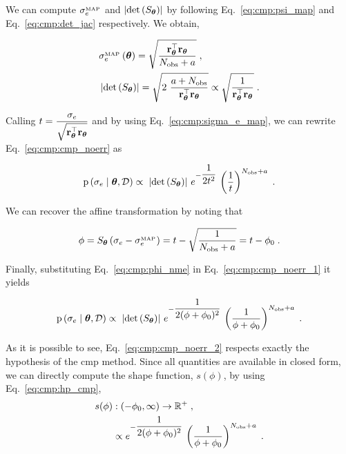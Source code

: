 We can compute $\sigma_e^{_{\text{MAP}}}$ and $\left| \mathrm{det}\left(S_{\boldsymbol{\theta}}\right) \right|$ by following Eq.~\eqref{eq:cmp:psi_map} and Eq.~\eqref{eq:cmp:det_jac} respectively. We obtain,

\begin{equation}
    \left.
    \begin{aligned}
        &\sigma_e^{_\map} \left( \btheta \right) = \sqrt{\dfrac{\rr}{\nobs+a}} \;,\\
        &\abs{\detf{S_{\btheta}}} = \sqrt{2 \ \dfrac{a+\nobs}{\rr}}  \propto \sqrt{\dfrac{1}{\rr}}\;.\\
    \end{aligned}
    \right.
    \label{eq:cmp:sigma_e_map}
\end{equation}

Calling $t = \dfrac{\sigma_e}{\sqrt{\mathbf{r}_{\boldsymbol{\theta}}^{\top} \mathbf{r}_{\boldsymbol{\theta}}}}$ and by using Eq.~\eqref{eq:cmp:sigma_e_map}, we can rewrite Eq.~\eqref{eq:cmp:cmp_noerr} as

\begin{equation}
    \mathrm{p} \left( \sigma_e \mid \boldsymbol{\theta}, \mathcal{D} \right) \propto \; \left| \mathrm{det}\left(S_{\boldsymbol{\theta}}\right) \right| \, e^{-\dfrac{1}{2 t^2}} \,
    \left(\dfrac{1}{t}\right)^{N_{\mathrm{obs}}+a}\; .
    \label{eq:cmp:cmp_noerr_1}
\end{equation}

We can recover the affine transformation by noting that

\begin{equation}
    \phi = S_{\boldsymbol{\theta}} \left( \sigma_e - \sigma_e^{_{\text{MAP}}} \right) = t - \sqrt{\frac{1}{N_{\mathrm{obs}}+a}} = t - \phi_0\;.
    \label{eq:cmp:phi_nme}
\end{equation}

Finally, substituting Eq.~\eqref{eq:cmp:phi_nme} in Eq.~\eqref{eq:cmp:cmp_noerr_1} it yields

\begin{equation}
    \mathrm{p} \left( \sigma_e \mid \boldsymbol{\theta}, \mathcal{D} \right) \propto \; \left| \mathrm{det}\left(S_{\boldsymbol{\theta}}\right) \right| \, e^{-\dfrac{1}{2 (\phi+\phi_0)^2}} \,
    \left(\dfrac{1}{\phi+\phi_0}\right)^{N_{\mathrm{obs}}+a}\; .
    \label{eq:cmp:cmp_noerr_2}
\end{equation}

As it is possible to see, Eq.~\eqref{eq:cmp:cmp_noerr_2} respects exactly the hypothesis of the \gls{cmp} method. Since all quantities are available in closed form, we can directly compute the shape function, $s(\phi)$, by using Eq.~\eqref{eq:cmp:hp_cmp},
\begin{equation}
    \left.
    \begin{aligned}
        s(\phi) &: (-\phi_0, \infty) \rightarrow \mathbb{R}^+ \;,\\
        &\propto e^{-\dfrac{1}{2 (\phi+\phi_0)^2}} \,
        \left(\dfrac{1}{\phi+\phi_0}\right)^{N_{\mathrm{obs}}+a} \;.
    \end{aligned}
    \right.
\end{equation}

